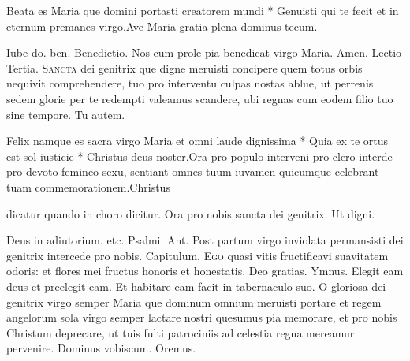 \begin{multicols*}{2}
\begin{responsory}[beata-es]
{Beata es Maria que domini portasti creatorem mundi * Genuisti qui te fecit et in eternum premanes virgo.}{Ave Maria gratia plena dominus tecum.}
\end{responsory}
Iube do. ben. {\color{Red} Benedictio.} Nos cum prole pia benedicat virgo Maria. Amen. {\color{Red} Lectio Tertia.}
\lettrine[lines=2]{\zallmancaps \color{Blue} S}{ancta} dei genitrix que digne meruisti concipere quem totus orbis nequivit comprehendere, tuo pro interventu culpas nostas ablue, ut perrenis sedem glorie per te redempti valeamus scandere, ubi regnas cum eodem filio tuo sine tempore. Tu autem.
\begin{responsory-final}
{Felix namque es sacra virgo Maria et omni laude dignissima * Quia ex te ortus est sol iusticie * Christus deus noster.}{Ora pro populo interveni pro clero interde pro devoto femineo sexu, sentiant omnes tuum iuvamen quicumque celebrant tuam commemorationem.}{Christus}
\end{responsory-final}
 {\color{Red} dicatur quando in choro dicitur.} \V Ora pro nobis sancta dei genitrix. \R Ut digni.
{\color{Red} }
\par \noindent Deus in adiutorium. etc. {\color{Red} Psalmi.}
{\color{Red} Ant.} Post partum virgo inviolata permansisti dei genitrix intercede pro nobis. {\color{Red} Capitulum.}
\lettrine[lines=2]{\zallmancaps \color{Red} E}{go} quasi vitis fructificavi suavitatem odoris: et flores mei fructus honoris et honestatis. Deo gratias. {\color{Red} Ymnus.}
\newline \V Elegit eam deus et preelegit eam. \R Et habitare eam facit in tabernaculo suo.
 O gloriosa dei genitrix virgo semper Maria que dominum omnium meruisti portare et regem angelorum sola virgo semper lactare nostri quesumus pia memorare, et pro nobis Christum deprecare, ut tuis fulti patrociniis ad celestia regna mereamur pervenire. Dominus vobiscum. Oremus.

\end{multicols*}
